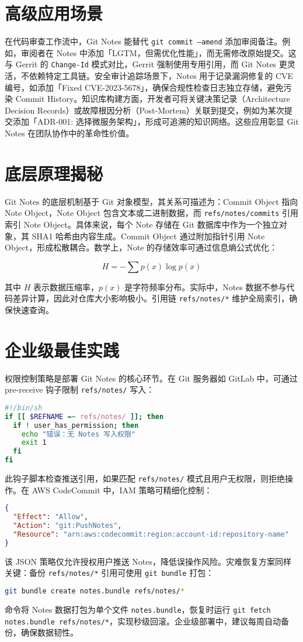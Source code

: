 \chapter{高级应用场景}
在代码审查工作流中，Git Notes 能替代 \texttt{git commit --amend} 添加审阅备注。例如，审阅者在 Notes 中添加「LGTM，但需优化性能」，而无需修改原始提交。这与 Gerrit 的 \texttt{Change-Id} 模式对比，Gerrit 强制使用专用引用，而 Git Notes 更灵活，不依赖特定工具链。安全审计追踪场景下，Notes 用于记录漏洞修复的 CVE 编号，如添加「Fixed CVE-2023-5678」，确保合规性检查日志独立存储，避免污染 Commit History。知识库构建方面，开发者可将关键决策记录（Architecture Decision Records）或故障根因分析（Post-Mortem）关联到提交，例如为某次提交添加「ADR-001: 选择微服务架构」，形成可追溯的知识网络。这些应用彰显 Git Notes 在团队协作中的革命性价值。\par
\chapter{底层原理揭秘}
Git Notes 的底层机制基于 Git 对象模型，其关系可描述为：Commit Object 指向 Note Object，Note Object 包含文本或二进制数据，而 \texttt{refs/notes/commits} 引用索引 Note Object。具体来说，每个 Note 存储在 Git 数据库中作为一个独立对象，其 SHA1 哈希由内容生成。Commit Object 通过附加指针引用 Note Object，形成松散耦合。数学上，Note 的存储效率可通过信息熵公式优化：\par
$$H = -\sum p(x) \log p(x)$$\par
其中 $H$ 表示数据压缩率，$p(x)$ 是字符频率分布。实际中，Notes 数据不参与代码差异计算，因此对仓库大小影响极小。引用链 \texttt{refs/notes/*} 维护全局索引，确保快速查询。\par
\chapter{企业级最佳实践}
权限控制策略是部署 Git Notes 的核心环节。在 Git 服务器如 GitLab 中，可通过 pre-receive 钩子限制 \texttt{refs/notes/} 写入：\par
\begin{lstlisting}[language=bash]
#!/bin/sh
if [[ $REFNAME =~ refs/notes/ ]]; then
  if ! user_has_permission; then
    echo "错误：无 Notes 写入权限"
    exit 1
  fi
fi
\end{lstlisting}
此钩子脚本检查推送引用，如果匹配 \texttt{refs/notes/} 模式且用户无权限，则拒绝操作。在 AWS CodeCommit 中，IAM 策略可精细化控制：\par
\begin{lstlisting}[language=json]
{
  "Effect": "Allow",
  "Action": "git:PushNotes",
  "Resource": "arn:aws:codecommit:region:account-id:repository-name"
}
\end{lstlisting}
该 JSON 策略仅允许授权用户推送 Notes，降低误操作风险。灾难恢复方案同样关键：备份 \texttt{refs/notes/*} 引用可使用 \texttt{git bundle} 打包：\par
\begin{lstlisting}[language=bash]
git bundle create notes.bundle refs/notes/*
\end{lstlisting}
命令将 Notes 数据打包为单个文件 \texttt{notes.bundle}，恢复时运行 \texttt{git fetch notes.bundle refs/notes/*}，实现秒级回滚。企业级部署中，建议每周自动备份，确保数据韧性。\par
